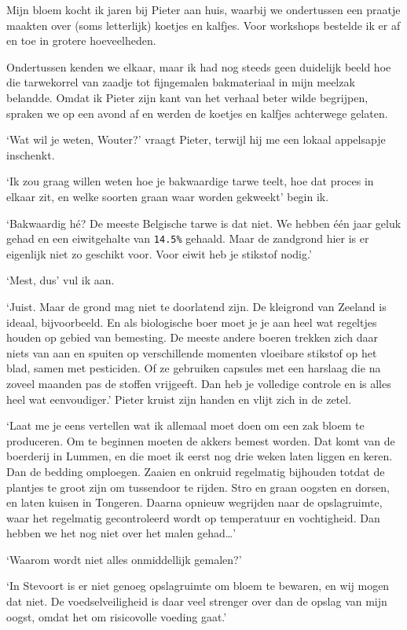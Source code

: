 \documentclass[
  11pt,
  dutch,
]{memoir}
\begin{document}
Mijn bloem kocht ik jaren bij Pieter aan huis, waarbij we ondertussen
een praatje maakten over (soms letterlijk) koetjes en kalfjes. Voor
workshops bestelde ik er af en toe in grotere hoeveelheden.

Ondertussen kenden we elkaar, maar ik had nog steeds geen duidelijk
beeld hoe die tarwekorrel van zaadje tot fijngemalen bakmateriaal in
mijn meelzak belandde. Omdat ik Pieter zijn kant van het verhaal beter
wilde begrijpen, spraken we op een avond af en werden de koetjes en
kalfjes achterwege gelaten.

`Wat wil je weten, Wouter?' vraagt Pieter, terwijl hij me een lokaal
appelsapje inschenkt.

`Ik zou graag willen weten hoe je bakwaardige tarwe teelt, hoe dat
proces in elkaar zit, en welke soorten graan waar worden gekweekt' begin
ik.

`Bakwaardig hé? De meeste Belgische tarwe is dat niet. We hebben één
jaar geluk gehad en een eiwitgehalte van \texttt{14.5\%} gehaald. Maar
de zandgrond hier is er eigenlijk niet zo geschikt voor. Voor eiwit heb
je stikstof nodig.'

`Mest, dus' vul ik aan.

`Juist. Maar de grond mag niet te doorlatend zijn. De kleigrond van
Zeeland is ideaal, bijvoorbeeld. En als biologische boer moet je je aan
heel wat regeltjes houden op gebied van bemesting. De meeste andere
boeren trekken zich daar niets van aan en spuiten op verschillende
momenten vloeibare stikstof op het blad, samen met pesticiden. Of ze
gebruiken capsules met een harslaag die na zoveel maanden pas de stoffen
vrijgeeft. Dan heb je volledige controle en is alles heel wat
eenvoudiger.' Pieter kruist zijn handen en vlijt zich in de zetel.

`Laat me je eens vertellen wat ik allemaal moet doen om een zak bloem te
produceren. Om te beginnen moeten de akkers bemest worden. Dat komt van
de boerderij in Lummen, en die moet ik eerst nog drie weken laten liggen
en keren. Dan de bedding omploegen. Zaaien en onkruid regelmatig
bijhouden totdat de plantjes te groot zijn om tussendoor te rijden. Stro
en graan oogsten en dorsen, en laten kuisen in Tongeren. Daarna opnieuw
wegrijden naar de opslagruimte, waar het regelmatig gecontroleerd wordt
op temperatuur en vochtigheid. Dan hebben we het nog niet over het malen
gehad\ldots{}'

`Waarom wordt niet alles onmiddellijk gemalen?'

`In Stevoort is er niet genoeg opslagruimte om bloem te bewaren, en wij
mogen dat niet. De voedselveiligheid is daar veel strenger over dan de
opslag van mijn oogst, omdat het om risicovolle voeding gaat.'
\end{document}
